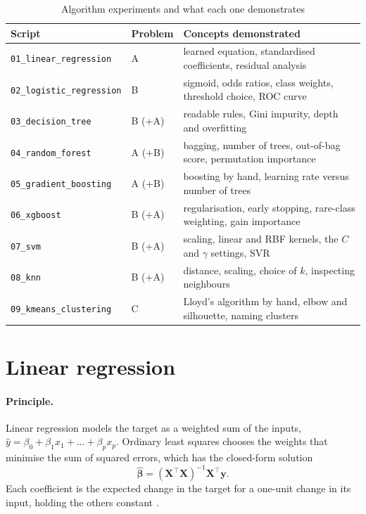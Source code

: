 \begin{table}[htbp]\centering\small
\caption{Algorithm experiments and what each one demonstrates}\label{tab:lessons}
\begin{tabularx}{\linewidth}{@{}llX@{}}
\toprule
\textbf{Script} & \textbf{Problem} & \textbf{Concepts demonstrated} \\ \midrule
\texttt{01\_linear\_regression} & A & learned equation, standardised coefficients, residual analysis \\
\texttt{02\_logistic\_regression} & B & sigmoid, odds ratios, class weights, threshold choice, ROC curve \\
\texttt{03\_decision\_tree} & B (+A) & readable rules, Gini impurity, depth and overfitting \\
\texttt{04\_random\_forest} & A (+B) & bagging, number of trees, out-of-bag score, permutation importance \\
\texttt{05\_gradient\_boosting} & A (+B) & boosting by hand, learning rate versus number of trees \\
\texttt{06\_xgboost} & B (+A) & regularisation, early stopping, rare-class weighting, gain importance \\
\texttt{07\_svm} & B (+A) & scaling, linear and RBF kernels, the $C$ and $\gamma$ settings, SVR \\
\texttt{08\_knn} & B (+A) & distance, scaling, choice of $k$, inspecting neighbours \\
\texttt{09\_kmeans\_clustering} & C & Lloyd's algorithm by hand, elbow and silhouette, naming clusters \\ \bottomrule
\end{tabularx}
\end{table}

\section{Linear regression}
\paragraph{Principle.} Linear regression models the target as a weighted sum of the inputs,
$\hat y = \beta_0 + \beta_1 x_1 + \dots + \beta_p x_p$. Ordinary least squares chooses the weights that minimise
the sum of squared errors, which has the closed-form solution
\[
  \hat{\boldsymbol\beta} = (\mathbf X^\top \mathbf X)^{-1}\mathbf X^\top \mathbf y .
\]
Each coefficient is the expected change in the target for a one-unit change in its input, holding the others
constant \citep{montgomery2021, james2021}.

